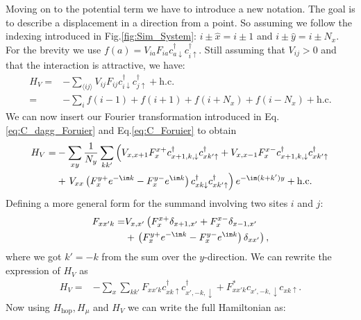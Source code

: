 \documentclass[../main.tex]{subfile}
\begin{document}
Moving on to the potential term we have to introduce a new notation. The goal is to describe a displacement in a direction from a point. So assuming
we follow the indexing introduced in Fig.\ref{fig:Sim_System}: $i\pm\hat{x} = i\pm 1$ and $i\pm\hat{y} = i\pm N_x$.
For the brevity we use $f(a) = V_{ia}F_{ia} c^{\dagger}_{a\downarrow} c^{\dagger}_{i\uparrow}$. Still assuming that $V_{ij}>0$ and that the interaction is attractive, we have:
\begin{align*}
    H_V =& -\sum_{\langle ij\rangle} V_{ij} F_{ij} c^{\dagger}_{i\downarrow} c^{\dagger}_{j\uparrow} + \text{h.c.} \\
    =& -\sum_{i} f(i-1) + f(i+1) + f(i+N_x) + f(i-N_x) + \text{h.c.}
\end{align*}
We can now insert our Fourier transformation introduced in Eq.\ref{eq:C_dagg_Foruier} and Eq.\ref{eq:C_Foruier} to obtain
\begin{align*}
    H_V =& -\sum_{xy} \frac{1}{N_y} \sum_{kk'} \left( V_{x,x+1} F_{x}^{x+} c^{\dagger}_{x+1,k,\downarrow}c^{\dagger}_{xk'\uparrow} + V_{x,x-1} F_{x}^{x-} c^{\dagger}_{x+1,k,\downarrow} c^{\dagger}_{xk'\uparrow} \right.\\
        &+ \left.V_{xx}\left( F_{x}^{y+} e^{-\im k}  - F_{x}^{y-} e^{\im k}\right) c^{\dagger}_{xk\downarrow} c^{\dagger}_{xk'\uparrow} \right) e^{-\im(k + k')y} + \text{h.c.}\\
\end{align*}
Defining a more general form for the summand involving two sites $i$ and $j$:
\begin{equation*}
    \begin{aligned}
    F_{xx'k} =&  V_{x,x'}\left( F_{x}^{x+} \delta_{x+1,x'} +  F_{x}^{x-} \delta_{x-1,x'}\right. \\
        &+ \left.\left( F_{x}^{y+} e^{-\im k}  - F_{x}^{y-} e^{\im k}\right)\delta_{xx'}\right),
    \end{aligned}
\end{equation*} 
where we got $k' = -k$ from the sum over the $y$-direction. We can rewrite the expression of $H_V$ as
\begin{align*}
    H_V =& -\sum_{x} \sum_{kk'} F_{xx'k} c^{\dagger}_{xk\uparrow} c^{\dagger}_{x',-k,\downarrow} + F_{xx'k}^{\ast} c_{x',-k,\downarrow} c_{xk\uparrow}.
\end{align*}
Now using $H_{\text{hop}}, H_{\mu}$ and $H_{V}$ we can write the full Hamiltonian as:
\end{document}
